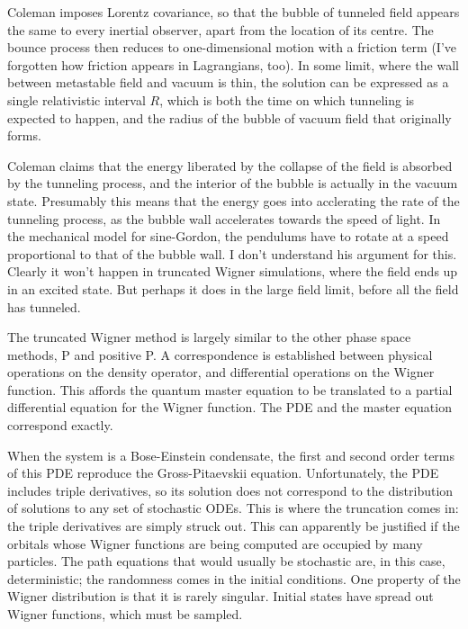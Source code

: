 Coleman imposes Lorentz covariance, so that the bubble of tunneled field appears the same to every inertial observer, apart from the location of its centre.  The bounce process then reduces to one-dimensional motion with a friction term (I've forgotten how friction appears in Lagrangians, too).   In some limit, where the wall between metastable field and vacuum is thin, the solution can be expressed as a single relativistic interval $R$, which is both the time on which tunneling is expected to happen, and the radius of the bubble of vacuum field that originally forms.

Coleman claims that the energy liberated by the collapse of the field is absorbed by the tunneling process, and the interior of the bubble is actually in the vacuum state.  Presumably this means that the energy goes into acclerating the rate of the tunneling process, as the bubble wall accelerates towards the speed of light.  In the mechanical model for sine-Gordon, the pendulums have to rotate at a speed proportional to that of the bubble wall.  I don't understand his argument for this.  Clearly it won't happen in truncated Wigner simulations, where the field ends up in an excited state.  But perhaps it does in the large field limit, before all the field has tunneled.



The truncated Wigner method is largely similar to the other phase space methods, P and positive {P}.  A correspondence is established between physical operations on the density operator, and differential operations on the Wigner function.  This affords the quantum master equation to be translated to a partial differential equation for the Wigner function.  The PDE and the master equation correspond exactly.

When the system is a Bose-Einstein condensate, the first and second order terms of this PDE reproduce the Gross-Pitaevskii equation.  Unfortunately, the PDE includes triple derivatives, so its solution does not correspond to the distribution of solutions to any set of stochastic ODEs.  This is where the truncation comes in: the triple derivatives are simply struck out.  This can apparently be justified if the orbitals whose Wigner functions are being computed are occupied by many particles.  The path equations that would usually be stochastic are, in this case, deterministic; the randomness comes in the initial conditions.  One property of the Wigner distribution is that it is rarely singular.  Initial states have spread out Wigner functions, which must be sampled.

